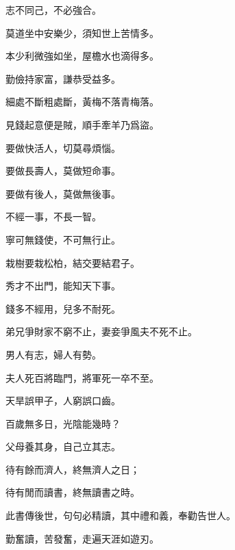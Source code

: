 \documentclass[12pt,a4paper]{ctexbook}
\begin{document}
志不同己，不必強合。\par
莫道坐中安樂少，須知世上苦情多。\par
本少利微強如坐，屋檐水也滴得多。\par
勤儉持家富，謙恭受益多。\par
細處不斷粗處斷，黃梅不落青梅落。\par
見錢起意便是賊，順手牽羊乃爲盜。\par
要做快活人，切莫尋煩惱。\par
要做長壽人，莫做短命事。\par
要做有後人，莫做無後事。\par
不經一事，不長一智。\par
寧可無錢使，不可無行止。\par
栽樹要栽松柏，結交要結君子。\par
秀才不出門，能知天下事。\par
錢多不經用，兒多不耐死。\par
弟兄爭財家不窮不止，妻妾爭風夫不死不止。\par
男人有志，婦人有勢。\par
夫人死百將臨門，將軍死一卒不至。\par
天旱誤甲子，人窮誤口齒。\par
百歲無多日，光陰能幾時？\par
父母養其身，自己立其志。\par
待有餘而濟人，終無濟人之日；\par
待有閒而讀書，終無讀書之時。\par
此書傳後世，句句必精讀，其中禮和義，奉勸告世人。\par
勤奮讀，苦發奮，走遍天涯如遊刃。\par
\end{document}
